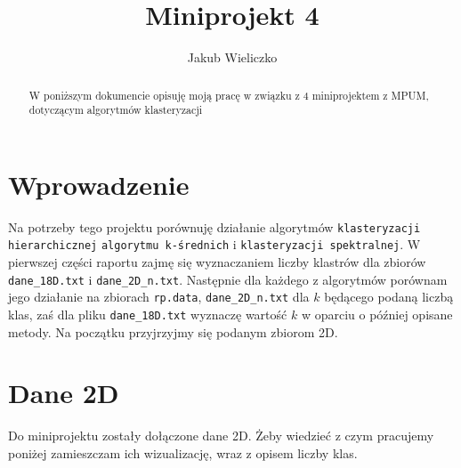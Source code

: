 \documentclass[polish,12pt,a4paper]{extarticle}
\title{Miniprojekt 4}
\author{Jakub Wieliczko}
\begin{document}
\begin{abstract}
W poniższym dokumencie opisuję moją pracę w związku z 4 miniprojektem z MPUM, dotyczącym algorytmów klasteryzacji
\end{abstract}
\section*{Wprowadzenie}
Na potrzeby tego projektu porównuję działanie algorytmów \texttt{klasteryzacji hierarchicznej} \texttt{algorytmu k-średnich} i \texttt{klasteryzacji spektralnej}. W pierwszej części raportu zajmę się wyznaczaniem liczby klastrów dla zbiorów  \texttt{dane\_18D.txt} i \texttt{dane\_2D\_n.txt}. Następnie dla każdego z algorytmów porównam jego działanie na zbiorach \texttt{rp.data}, \texttt{dane\_2D\_n.txt} dla $k$ będącego podaną liczbą klas, zaś dla pliku \texttt{dane\_18D.txt} wyznaczę wartość $k$ w oparciu o później opisane metody. Na początku przyjrzyjmy się podanym zbiorom 2D.
\section{Dane 2D}
Do miniprojektu zostały dołączone dane 2D. Żeby wiedzieć z czym pracujemy poniżej zamieszczam ich wizualizację, wraz z opisem liczby klas.
\end{document}
